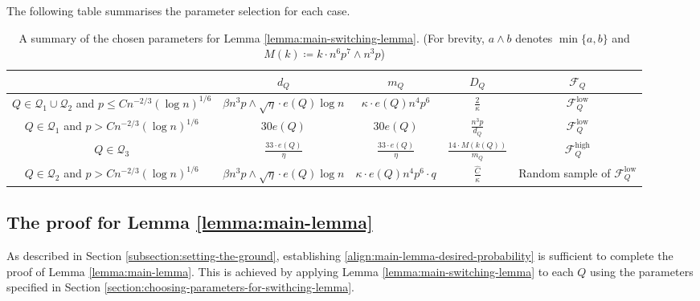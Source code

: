\documentclass[11pt,a4paper,oneside,reqno]{amsart}
\newcommand{\cF}{\mathcal{F}}
\newcommand{\cQ}{\mathcal{Q}}
\newcommand{\1}{\mathbbm{1}} %
\renewcommand{\le}{\leqslant}
\newcommand{\cFQL}{\cF_Q^{\mathrm{low}}}
\newcommand{\cFQH}{\cF_Q^{\mathrm{high}}}
\begin{document}
The following table summarises the parameter selection for each case.
\begin{table}[h!]
\centering
\renewcommand{\arraystretch}{1.5}
\begin{tabular}{|c|c|c|c|c|}
\hline
\textbf{} & \textbf{$d_Q$} & \textbf{$m_Q$} & \textbf{$D_Q$} & \textbf{$\cF_Q$} \\
\hline
\makecell{$Q \in \cQ_1 \cup \cQ_2$ and \\ $p \le C n^{-2/3} \left(\log n\right)^{1/6}$} & $\beta n^3 p \wedge \sqrt{\eta} \cdot e(Q) \log n$ & $\kappa \cdot e(Q) n^4 p^6$ & $\frac{2}{\kappa}$ & $\cFQL$ \\
\hline
\makecell{$Q \in \cQ_1$ and \\ $p > C n^{-2/3} \left(\log n\right)^{1/6}$} & $30 e(Q)$ & $30 e(Q)$ & $\frac{n^3 p}{d_Q}$ & $\cFQL$ \\
\hline
$Q \in \cQ_3$ & $\frac{33 \cdot e(Q)}{\eta}$ & $\frac{33 \cdot e(Q)}{\eta}$ & $\frac{14 \cdot M(k(Q))}{m_Q}$ & $\cFQH$ \\
\hline
\makecell{$Q \in \cQ_2$ and \\ $p > C n^{-2/3} \left(\log n\right)^{1/6}$} & $\beta n^3 p \wedge \sqrt{\eta} \cdot e(Q) \log n$ & $\kappa \cdot e(Q) n^4 p^6 \cdot q$ & $\frac{\hat{C}}{\kappa}$ & \makecell{Random sample \\ of $\cFQL$} \\
\hline
\end{tabular}
\caption{A summary of the chosen parameters for Lemma \ref{lemma:main-switching-lemma}. (For brevity, $a \wedge b$ denotes $\min\{a,b\}$ and $M(k) \coloneqq k \cdot n^6 p^7 \wedge n^3 p$)}
\label{table:parameters for Q}
\end{table}

\subsection{The proof for Lemma \ref{lemma:main-lemma}}\label{section:proof-of-main-lemma}
As described in Section \ref{subsection:setting-the-ground}, establishing \eqref{align:main-lemma-desired-probability} is sufficient to complete the proof of Lemma \ref{lemma:main-lemma}. This is achieved by applying Lemma \ref{lemma:main-switching-lemma} to each $Q$ using the parameters specified in Section \ref{section:choosing-parameters-for-swithcing-lemma}.
\end{document}
